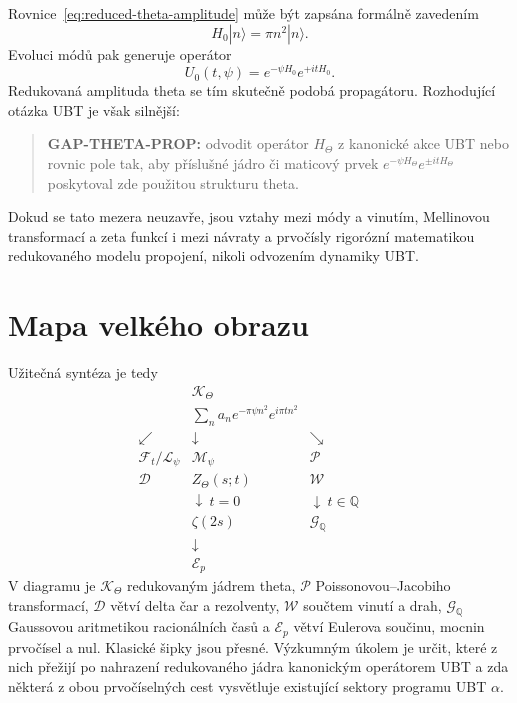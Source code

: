 Rovnice~\eqref{eq:reduced-theta-amplitude} může být zapsána formálně zavedením
\begin{equation}
 H_0|n\rangle=\pi n^2|n\rangle.
\end{equation}
Evoluci módů pak generuje operátor
\begin{equation}
 U_0(t,\psi)=e^{-\psi H_0}e^{+itH_0}.
 \label{eq:formal-complex-propagator}
\end{equation}
Redukovaná amplituda theta se tím skutečně podobá propagátoru. Rozhodující
otázka UBT je však silnější:
\begin{quote}
\textbf{GAP-THETA-PROP:} odvodit operátor $H_\Theta$ z kanonické akce UBT nebo
rovnic pole tak, aby příslušné jádro či maticový prvek
$e^{-\psi H_\Theta}e^{\pm itH_\Theta}$ poskytoval zde použitou strukturu theta.
\end{quote}
Dokud se tato mezera neuzavře, jsou vztahy mezi módy a vinutím, Mellinovou
transformací a zeta funkcí i mezi návraty a prvočísly rigorózní matematikou
redukovaného modelu propojení, nikoli odvozením dynamiky UBT.

\section{Mapa velkého obrazu}

Užitečná syntéza je tedy
\begin{equation}
\boxed{
\begin{array}{ccccc}
 & \mathcal K_\Theta & & &\\
 & \displaystyle\sum_n a_n e^{-\pi\psi n^2}e^{i\pi t n^2} & & &\\[2mm]
 \swarrow & \downarrow & \searrow & &\\[-1mm]
 \mathcal F_t/\mathcal L_\psi & \mathcal M_\psi & \mathcal P & &\\
 \mathcal D & Z_\Theta(s;t) & \mathcal W & &\\
 & \downarrow\ t=0 & \downarrow\ t\in\mathbb Q & &\\
 & \zeta(2s) & \mathcal G_{\mathbb Q} & &\\
 & \downarrow & & &\\
 & \mathcal E_p & & &
\end{array}}
\end{equation}
V diagramu je $\mathcal K_\Theta$ redukovaným jádrem theta, $\mathcal P$
Poissonovou--Jacobiho transformací, $\mathcal D$ větví delta čar a rezolventy,
$\mathcal W$ součtem vinutí a drah, $\mathcal G_{\mathbb Q}$ Gaussovou
aritmetikou racionálních časů a $\mathcal E_p$ větví Eulerova součinu, mocnin
prvočísel a nul.
Klasické šipky jsou přesné. Výzkumným úkolem je určit, které z nich přežijí po
nahrazení redukovaného jádra kanonickým operátorem UBT a zda některá z obou
prvočíselných cest vysvětluje existující sektory programu UBT $\alpha$.
